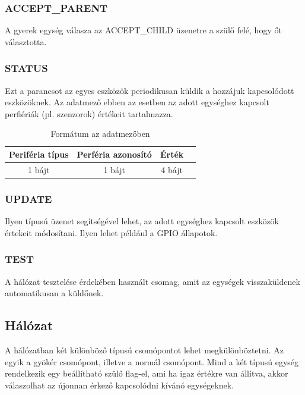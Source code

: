 \subsubsection{ACCEPT\_PARENT}
A gyerek egység válasza az ACCEPT\_CHILD üzenetre a szülő felé, hogy őt választotta.
\subsubsection{STATUS}
Ezt a parancsot az egyes eszközök periodikusan küldik a hozzájuk kapcsolódott eszközöknek. Az adatmező ebben az esetben az adott egységhez kapcsolt perfiériák (pl. szenzorok) értékeit tartalmazza. 

\begin{table}[ht]
	\footnotesize
	\centering
	\begin{tabular}{ | c | c | c | c |}
		\toprule
		Periféria típus & Perféria azonosító & Érték \\
		\midrule
        1 bájt & 1 bájt & 4 bájt \\
	\end{tabular}
	\caption{Formátum az adatmezőben}
	\label{tab:TabularExample}
\end{table}

\subsubsection{UPDATE}
Ilyen típusú üzenet segítségével lehet, az adott egységhez kapcsolt eszközök értekeit módosítani. Ilyen lehet például a GPIO állapotok.
\subsubsection{TEST}
A hálózat tesztelése érdekében használt csomag, amit az egységek visszaküldenek automatikusan a küldőnek.


\subsection{Hálózat}
A hálózatban két különböző típusú csomópontot lehet megkülönböztetni. Az egyik a gyökér csomópont, illetve a normál csomópont. Mind a két típusú egység rendelkezik egy beállítható szülő flag-el, ami ha igaz értékre van állítva, akkor válaszolhat az újonnan érkező kapcsolódni kívánó egységeknek.


